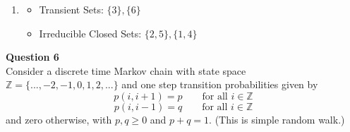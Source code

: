 \documentclass[12pt]{article}
\begin{document}
\begin{enumerate}[label=(\alph*)]
\item
        \begin{minipage}[t]{0.4\textwidth}
          \centering{}
        
        
        \end{minipage}\hfill
        \begin{minipage}[t]{0.65\textwidth}
          \vspace{3\baselineskip}
          \begin{itemize}
                \item Transient Sets: $\{3\}, \{6\}$
                \item Irreducible Closed Sets: $\{2,5\}, \{1,4\}$          
          \end{itemize}
        \end{minipage}
\end{enumerate}


\vspace{1.5\baselineskip}
\noindent


\newpage
\noindent
\textbf{Question 6}\\
Consider a discrete time Markov chain with state space $\mathbb{Z} = \{. . . ,−2,−1, 0, 1, 2, . . . \}$ and one
step transition probabilities given by
$$p(i,i+1) = p \qquad \text{for all } i\in \mathbb{Z}$$
$$p(i,i-1) = q \qquad \text{for all } i\in \mathbb{Z}$$
and zero otherwise, with $p,q\ge 0$ and $p + q = 1$. (This is simple random walk.)
\end{document}
